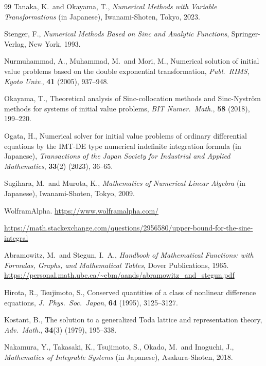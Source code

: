 \documentclass[pdflatex,sn-mathphys-num]{sn-jnl}%
\theoremstyle{thmstyleone}%
\theoremstyle{thmstyletwo}%
\theoremstyle{thmstylethree}%
\begin{document}

\begin{thebibliography}{99}
Tanaka, K.~and Okayama, T., {\it Numerical Methods with Variable Transformations} (in Japanese), Iwanami-Shoten, Tokyo, 2023.

Stenger, F., {\it Numerical Methods Based on Sinc and Analytic Functions}, Springer-Verlag, New York, 1993.

Nurmuhammad, A., Muhammad, M.~and Mori, M., Numerical solution of initial value problems based on the double exponential transformation, {\it Publ.~RIMS, Kyoto Univ}., {\bf 41} (2005), 937--948.

Okayama, T., Theoretical analysis of Sinc-collocation methods and Sinc-Nystr\"{o}m methods for systems of initial value problems, {\it BIT Numer.~Math.}, {\bf 58} (2018), 199--220.

Ogata, H., Numerical solver for initial value problems of ordinary differential equations by the IMT-DE type numerical
indefinite integration formula  (in Japanese), {\it Transactions of the Japan Society for Industrial and Applied Mathematics}, {\bf 33}(2) (2023), 36--65.

Sugihara, M.~and Murota, K., {\it Mathematics of Numerical Linear Algebra} (in Japanese), Iwanami-Shoten, Tokyo, 2009.

WolframAlpha. \url{https://www.wolframalpha.com/}

\url{https://math.stackexchange.com/questions/2956580/upper-bound-for-the-sine-integral}

Abramowitz, M.~and Stegun, I.~A., {\it Handbook of Mathematical Functions: with Formulas, Graphs, and Mathematical Tables}, Dover Publications, 1965. \\
\url{https://personal.math.ubc.ca/~cbm/aands/abramowitz_and_stegun.pdf}

Hirota, R., Tsujimoto, S., Conserved quantities of a class of nonlinear difference equations, {\it J.~Phys.~Soc.~Japan}, {\bf 64} (1995), 3125--3127.

Kostant, B., The solution to a generalized Toda lattice and representation theory, {\it Adv.~Math.}, {\bf 34}(3) (1979), 195--338.

Nakamura, Y., Takasaki, K., Tsujimoto, S., Okado, M.~and Inoguchi, J., {\it Mathematics of Integrable Systems} (in Japanese), Asakura-Shoten, 2018.
\end{thebibliography}
\end{document}
